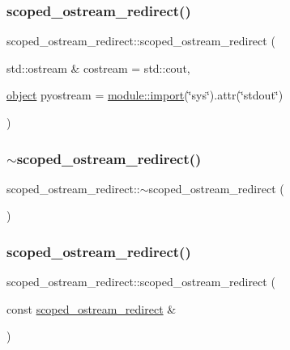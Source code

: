 \subsubsection{\texorpdfstring{scoped\_ostream\_redirect()}{scoped\_ostream\_redirect()}\hspace{0.1cm}{\footnotesize\ttfamily [1/3]}}
{\footnotesize\ttfamily scoped\+\_\+ostream\+\_\+redirect\+::scoped\+\_\+ostream\+\_\+redirect (\begin{DoxyParamCaption}\item[{std\+::ostream \&}]{costream = {\ttfamily std\+:\+:cout},  }\item[{\mbox{\hyperlink{classobject}{object}}}]{pyostream = {\ttfamily \mbox{\hyperlink{classmodule_a40817edef0ded5727701534bcded9982}{module\+::import}}(\char`\"{}sys\char`\"{}).attr(\char`\"{}stdout\char`\"{})} }\end{DoxyParamCaption})\hspace{0.3cm}{\ttfamily [inline]}}

\mbox{\label{classscoped__ostream__redirect_a95ab99016f73336eb87d275ee88adfbf}} 
\subsubsection{\texorpdfstring{$\sim$scoped\_ostream\_redirect()}{~scoped\_ostream\_redirect()}}
{\footnotesize\ttfamily scoped\+\_\+ostream\+\_\+redirect\+::$\sim$scoped\+\_\+ostream\+\_\+redirect (\begin{DoxyParamCaption}{ }\end{DoxyParamCaption})\hspace{0.3cm}{\ttfamily [inline]}}

\mbox{\label{classscoped__ostream__redirect_a1246061ecc80a86fb4ccdaba343ce2fc}} 
\subsubsection{\texorpdfstring{scoped\_ostream\_redirect()}{scoped\_ostream\_redirect()}\hspace{0.1cm}{\footnotesize\ttfamily [2/3]}}
{\footnotesize\ttfamily scoped\+\_\+ostream\+\_\+redirect\+::scoped\+\_\+ostream\+\_\+redirect (\begin{DoxyParamCaption}\item[{const \mbox{\hyperlink{classscoped__ostream__redirect}{scoped\+\_\+ostream\+\_\+redirect}} \&}]{ }\end{DoxyParamCaption})\hspace{0.3cm}{\ttfamily [delete]}}

